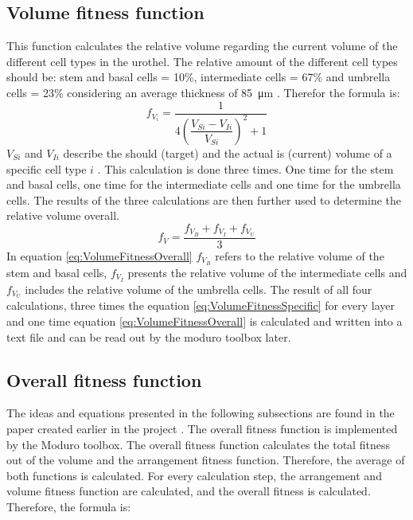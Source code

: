 \subsection{Volume fitness function} \label{subsec:VolumeFitness}
This function calculates the relative volume regarding the current volume of the different cell types in the urothel. The relative amount of the different cell types should be: stem and basal cells = 10\%, intermediate cells = 67\% and umbrella cells = 23\% considering an average thickness of \SI{85}{\micro\metre} \cite{Torelli2017}. Therefor the formula is:
\begin{equation}\label{eq:VolumeFitnessSpecific}
f_{V_{i}} = \dfrac{1}{4 (\dfrac{V_{Si}-V_{Ii}}{V_{Si}})^2 + 1}
\end{equation}
$V_{Si}$ and $V_{Ii}$ describe the should (target) and the actual is (current) volume of a specific cell type $i$ \cite{Torelli2017}.  This calculation is done three times. One time for the stem and basal cells, one time for the intermediate cells and one time for the umbrella cells. The results of the three calculations are then further used to determine the relative volume overall.
\begin{equation}\label{eq:VolumeFitnessOverall}
f_{V} = \dfrac{f_{V_{B}} + f_{V_{I}} + f_{V_{U}}}{3}
\end{equation}
In equation \ref{eq:VolumeFitnessOverall} $f_{V_{B}}$ refers to the relative volume of the stem and basal cells, $f_{V_{I}}$ presents the relative volume of the intermediate cells and $f_{V_{U}}$ includes the relative volume of the umbrella cells. \newline
The result of all four calculations, three times the equation \ref{eq:VolumeFitnessSpecific} for every layer and one time equation \ref{eq:VolumeFitnessOverall} is calculated and written into a text file and can be read out by the moduro toolbox later.


\subsection{Overall fitness function}
The ideas and equations presented in the following subsections are found in the paper created earlier in the project \cite{Torelli2017}. The overall fitness function is implemented by the Moduro toolbox. \newline
The overall fitness function calculates the total fitness out of the volume and the arrangement fitness function. Therefore, the average of both functions is calculated. For every calculation step, the arrangement and volume fitness function are calculated, and the overall fitness is calculated. Therefore, the formula is:

